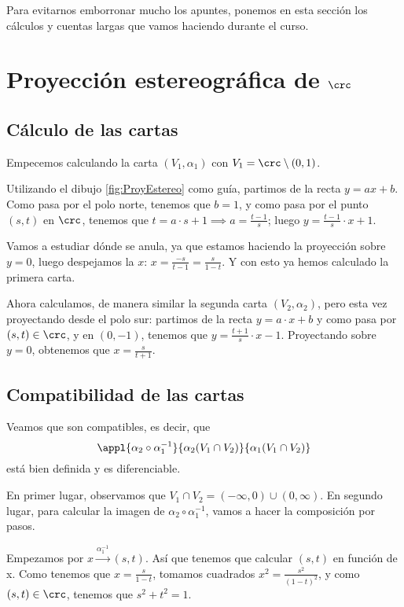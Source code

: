 
Para evitarnos emborronar mucho los apuntes, ponemos en esta sección los cálculos y cuentas largas que vamos haciendo durante el curso.

\section{Proyección estereográfica de $\crc$}
\label{sec:proyeccion_estereografica_crc}

\subsection{Cálculo de las cartas}
Empecemos calculando la carta $(V_1, \alpha_1)$ con $V_1 = \crc \setminus {(0,1)}$.

Utilizando el dibujo \ref{fig:ProyEstereo} como guía, partimos de la recta $y = ax + b$. Como pasa por el polo norte, tenemos que $b = 1$, y como pasa por el punto $(s,t)$ en $\crc$, tenemos que $t=a \cdot s + 1 \implies a = \frac{t-1}{s}$; luego $y = \frac{t-1}{s} \cdot x + 1$.

Vamos a estudiar dónde se anula, ya que estamos haciendo la proyección sobre $y=0$, luego despejamos la $x$: $x = \frac{-s}{t-1} = \frac{s}{1-t}$. Y con esto ya hemos calculado la primera carta.

Ahora calculamos, de manera similar la segunda carta $(V_2, \alpha_2)$, pero esta vez proyectando desde el polo sur: partimos de la recta $y=a \cdot x+b$ y como pasa por $(s,t) \in \crc$, y en $(0,-1)$, tenemos que $y = \frac{t+1}{s} \cdot x - 1$. Proyectando sobre $y=0$, obtenemos que $x = \frac{s}{t+1}$.

\subsection{Compatibilidad de las cartas}
Veamos que son compatibles, es decir, que
\[ \appl{\alpha_2 \circ \alpha_1^{-1}}{\alpha_2(V_1 \cap V_2)}{\alpha_1(V_1 \cap V_2)} \]
está bien definida y es diferenciable.

En primer lugar, observamos que $V_1 \cap V_2 = (-\infty, 0) \cup (0, \infty)$.
En segundo lugar, para calcular la imagen de $\alpha_2 \circ \alpha_1^{-1}$, vamos a hacer la composición por pasos.

Empezamos por $x \xrightarrow{\alpha_1^{-1}} (s,t)$. Así que tenemos que calcular $(s,t)$ en función de x. Como tenemos que $x = \frac{s}{1-t}$, tomamos cuadrados $x^2 = \frac{s^2}{(1-t)^2}$, y como $(s,t) \in \crc$, tenemos que $s^2+t^2=1$.

